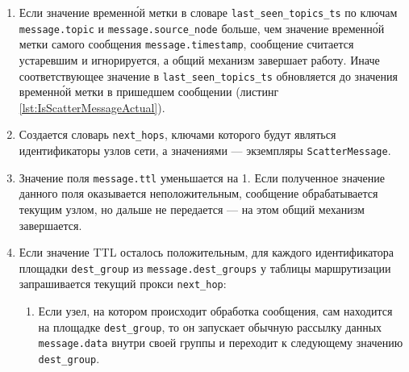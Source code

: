 \documentclass{article}
\theoremstyle{plain}
\theoremstyle{plain}
\theoremstyle{plain}
\theoremstyle{plain}
\theoremstyle{definition}
\theoremstyle{remark}
\theoremstyle{plain}
\begin{document}
\begin{enumerate}
    \item Если значение временн\'{о}й метки в словаре \texttt{last\_seen\_to\-pics\_ts} по ключам \texttt{mes\-sage.to\-pic} и \texttt{mes\-sage.source\_node} больше, чем значение временн\'{о}й метки самого сообщения \texttt{message.timestamp}, сообщение считается устаревшим и игнорируется, а общий механизм завершает работу. Иначе соответствующее значение в \texttt{last\_seen\_topics\_ts} обновляется до значения временн\'{о}й метки в пришедшем сообщении (листинг \ref{lst:IsScatterMessageActual}).


    \item Создается словарь \texttt{next\_hops}, ключами которого будут являться идентификаторы узлов сети, а значениями --- экземпляры \texttt{ScatterMessage}.
    
    \item Значение поля \texttt{message.ttl} уменьшается на 1. Если полученное значение данного поля оказывается неположительным, сообщение обрабатывается текущим узлом, но дальше не передается --- на этом общий механизм завершается.
    
    \item Если значение TTL осталось положительным, для каждого идентификатора площадки \texttt{dest\_group} из \texttt{message.dest\_groups} у таблицы маршрутизации запрашивается текущий прокси \texttt{next\_hop}:
    
    \begin{enumerate}
        \item Если узел, на котором происходит обработка сообщения, сам находится на площадке \texttt{dest\_group}, то он запускает обычную рассылку данных \texttt{message.data} внутри своей группы и переходит к следующему значению \texttt{dest\_group}.
    

\end{enumerate}
\end{enumerate}
\end{document}
